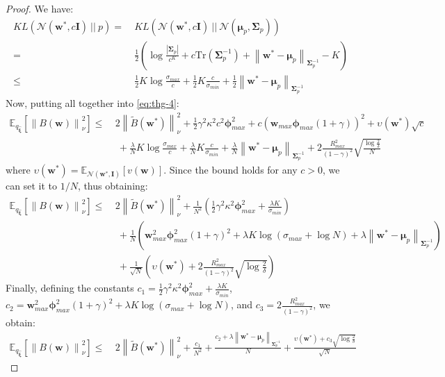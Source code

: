 \documentclass{article}
\newcommand{\wt}[1]{\widetilde{#1}}
\newcommand{\wh}[1]{\widehat{#1}}
\newcommand{\norm}[1]{\left\lVert #1 \right\rVert}
\newcommand{\abs}[1]{\left\lvert #1 \right\rvert}
\begin{document}
\begin{proof}
We have:
\begin{align*}
KL\left(\mathcal{N}(\bm{w}^*,c\bm{I})\ ||\ p\right) =\ & KL\left(\mathcal{N}(\bm{w}^*,c\bm{I})\ ||\ \mathcal{N}(\bm{\mu}_p,\bm{\Sigma}_p)\right)\\ =\ & \frac{1}{2}\left( \log\frac{\abs{\bm{\Sigma}_p}}{c^K} + c\text{Tr}\left( \bm{\Sigma}_p^{-1}\right) + \norm{\bm{w}^* - \bm{\mu}_p}_{\bm{\Sigma}_p^{-1}} -K \right)\\ \leq\ & \frac{1}{2}K\log\frac{\sigma_{max}}{c} + \frac{1}{2}K\frac{c}{\sigma_{min}} + \frac{1}{2}\norm{\bm{w}^* - \bm{\mu}_p}_{\bm{\Sigma}_p^{-1}}
\end{align*}
Now, putting all together into \ref{eq:thg-4}:
\begin{align*}
\mathbb{E}_{q_{\wh{\bm{\xi}}}}\left[ \norm{B(\bm{w})}_{\nu}^2 \right ] \leq\ & 2\norm{\wt{B}(\bm{w}^{*})}_{\nu}^2 + \frac{1}{2}\gamma^2\kappa^2 c^2\bm{\phi}_{max}^2 + c\left(\bm{w}_{max}\bm{\phi}_{max}(1 + \gamma)\right)^2 + \upsilon(\bm{w}^*)\sqrt{c}\\ &\ + \frac{\lambda}{N}K\log\frac{\sigma_{max}}{c} + \frac{\lambda}{N}K\frac{c}{\sigma_{min}} + \frac{\lambda}{N}\norm{\bm{w}^* - \bm{\mu}_p}_{\bm{\Sigma}_p^{-1}} + 2\frac{R_{max}^2}{(1-\gamma)^2}\sqrt{\frac{\log\frac{2}{\delta}}{N}}
\end{align*}
where $\upsilon(\bm{w}^*) = \mathbb{E}_{\mathcal{N}(\bm{w}^*,\bm{I})}\left[ v(\bm{w}) \right]$. Since the bound holds for any $c>0$, we can set it to $1/N$, thus obtaining:
\begin{align*}
\mathbb{E}_{q_{\wh{\bm{\xi}}}}\left[ \norm{B(\bm{w})}_{\nu}^2 \right ] \leq\ & 2\norm{\wt{B}(\bm{w}^{*})}_{\nu}^2 + \frac{1}{N^2}\left(\frac{1}{2}\gamma^2\kappa^2\bm{\phi}_{max}^2 + \frac{\lambda K}{\sigma_{min}}\right)\\ &\ + \frac{1}{N}\left(\bm{w}_{max}^2\bm{\phi}_{max}^2(1 + \gamma)^2 + \lambda K \log(\sigma_{max} + \log N) + \lambda\norm{\bm{w}^* - \bm{\mu}_p}_{\bm{\Sigma}_p^{-1}} \right)\\ &\ + \frac{1}{\sqrt{N}}\left(\upsilon(\bm{w}^*) + 2\frac{R_{max}^2}{(1-\gamma)^2}\sqrt{\log\frac{2}{\delta}}\right)
\end{align*}
Finally, defining the constants $c_1 = \frac{1}{2}\gamma^2\kappa^2\bm{\phi}_{max}^2 + \frac{\lambda K}{\sigma_{min}}$, $c_2 = \bm{w}_{max}^2\bm{\phi}_{max}^2(1 + \gamma)^2 + \lambda K \log(\sigma_{max} + \log N)$, and $c_3 = 2\frac{R_{max}^2}{(1-\gamma)^2}$, we obtain:
\begin{align*}
\mathbb{E}_{q_{\wh{\bm{\xi}}}}\left[ \norm{B(\bm{w})}_{\nu}^2 \right ] \leq\ & 2\norm{\wt{B}(\bm{w}^{*})}_{\nu}^2 + \frac{c_1}{N^2} + \frac{c_2 + \lambda\norm{\bm{w}^* - \bm{\mu}_p}_{\bm{\Sigma}_p^{-1}}}{N} + \frac{\upsilon(\bm{w}^*) + c_3\sqrt{\log\frac{2}{\delta}}}{\sqrt{N}}
\end{align*}
\end{proof}
\end{document}

